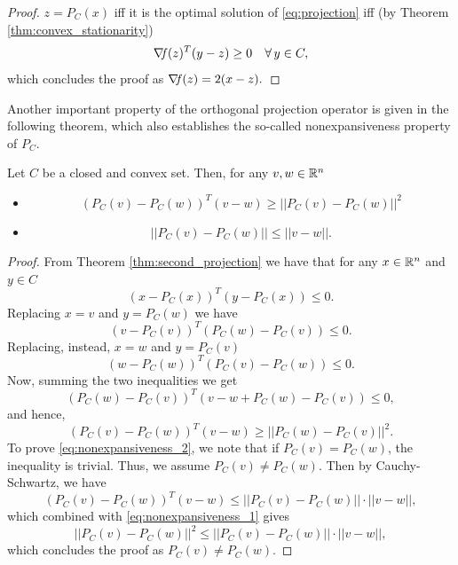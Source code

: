 \documentclass[10pt,a4paper]{article}
\begin{document}
\begin{proof}
	$z=P_C(x)$ iff it is the optimal solution of \eqref{eq:projection} iff (by Theorem \ref{thm:convex_stationarity})
	\begin{equation*}
		\operatorname*{\mathit{\nabla \!f}}(z)^T(y-z)\geq 0 \quad \forall\,y\in C,
	\end{equation*}
which concludes the proof as $\operatorname*{\mathit{\nabla \!f}}(z) = 2(x-z).$
\end{proof}
Another important property of the orthogonal projection operator is given in the
following theorem, which also establishes the so-called nonexpansiveness property of $P_C$.
\begin{theorem}
	Let $C$ be a closed and convex set. Then, for any $v,w\in \mathbb{R}^n$
	\begin{itemize}
		\item[a)] 
		\begin{equation}\label{eq:nonexpansiveness_1}
			(P_C(v)-P_C(w))^T(v-w)\geq ||P_C(v)-P_C(w)||^2
		\end{equation}
		\item[b)]
		\begin{equation}\label{eq:nonexpansiveness_2}
			 ||P_C(v)-P_C(w)||\leq ||v-w||.
		\end{equation}
	\end{itemize}
\end{theorem}
\begin{proof}
	From Theorem \ref{thm:second_projection} we have that for any $x \in \mathbb{R}^n$ and $y\in C$
	\begin{equation*}
		(x-P_C(x))^T(y-P_C(x)) \leq 0.
	\end{equation*}
Replacing $x=v$ and $y=P_C(w)$ we have
\begin{equation*}
	(v-P_C(v))^T(P_C(w)-P_C(v)) \leq 0.
\end{equation*}
Replacing, instead, $x=w$ and $y=P_C(v)$
\begin{equation*}
	(w-P_C(w))^T(P_C(v)-P_C(w)) \leq 0.
\end{equation*}
Now, summing the two inequalities we get
\begin{equation*}
	(P_C(w)-P_C(v))^T(v-w+P_C(w)-P_C(v)) \leq 0,
\end{equation*}
and hence, 
\begin{equation*}
	(P_C(v)-P_C(w))^T(v-w) \geq ||P_C(w)-P_C(v)||^2.
\end{equation*}
To prove \eqref{eq:nonexpansiveness_2}, we note that if $P_C(v) = P_C(w)$, the inequality is trivial. Thus, we assume $P_C(v) \neq P_C(w)$. Then by Cauchy-Schwartz, we have 
\begin{equation*}
	(P_C(v)-P_C(w))^T(v-w) \leq ||P_C(v)-P_C(w)|| \cdot||v-w||,
\end{equation*}
which combined with \eqref{eq:nonexpansiveness_1} gives 
\begin{equation*}
	||P_C(v)-P_C(w)||^2 \leq ||P_C(v)-P_C(w)|| \cdot||v-w||,
\end{equation*}
which concludes the proof as $P_C(v) \neq P_C(w)$.
\end{proof}
\end{document}
